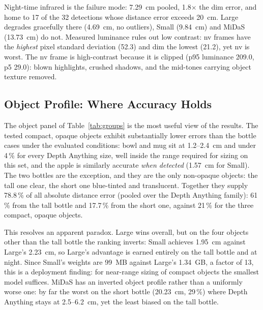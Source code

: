 \documentclass[conference]{IEEEtran}
\begin{document}
Night-time infrared is the failure mode: 7.29~cm pooled, 1.8$\times$ the dim
error, and home to 17 of the 32 detections whose distance error exceeds 20~cm. Large degrades
gracefully there (4.69~cm, no outliers), Small (9.84~cm) and MiDaS (13.73~cm) do
not. Measured luminance rules out low contrast: nv frames have the \emph{highest}
pixel standard deviation (52.3) and dim the lowest (21.2), yet nv is worst. The
nv frame is high-contrast because it is clipped (p95 luminance 209.0, p5 29.0):
blown highlights, crushed shadows, and the mid-tones carrying object texture
removed.

\subsection{Object Profile: Where Accuracy Holds}
The object panel of Table~\ref{tab:groups} is the most useful view of the
results. The tested compact, opaque objects exhibit substantially lower errors
than the bottle cases under the evaluated conditions: bowl and mug sit at
1.2--2.4~cm and under 4\,\% for every Depth Anything size, well inside the range
required for sizing on this set, and the apple is similarly accurate
\emph{when detected} (1.57~cm for Small). The two bottles are the exception, and
they are the only non-opaque
objects: the tall one clear, the short one blue-tinted and translucent. Together they
supply 78.8\,\% of all absolute distance error (pooled over the Depth Anything
family): 61\,\% from the tall bottle and 17.7\,\% from the short one, against
21\,\% for the three compact, opaque objects.

This resolves an apparent paradox. Large wins overall, but on the four objects
other than the tall bottle the ranking inverts: Small achieves 1.95~cm against
Large's 2.23~cm, so Large's advantage is earned entirely on the tall bottle and
at night. Since Small's weights are 99~MB against Large's 1.34~GB, a factor of
13, this is a deployment finding: for near-range sizing of
compact objects the smallest model suffices. MiDaS has an inverted object profile
rather than a uniformly worse one: by far the worst on the short bottle
(20.23~cm, 29\,\%) where Depth Anything stays at 2.5--6.2~cm, yet the least
biased on the tall bottle.
\end{document}

